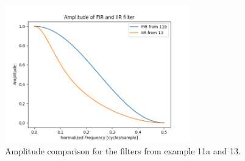\begin{figure}[h]
	\centering
	\includegraphics[width=8cm]{img/ex_13.png}
	\captionsetup{width=6cm}
	\caption{Amplitude comparison for the filters from example 11a and 13.}
\end{figure}
